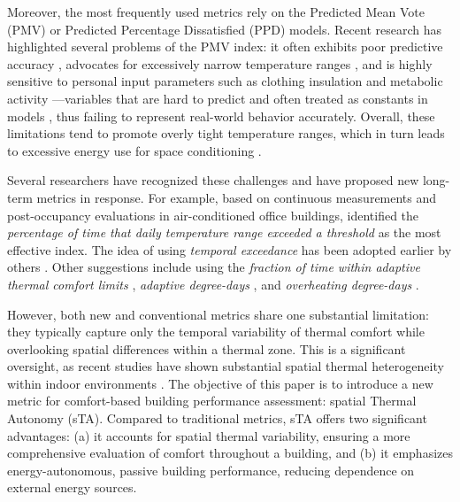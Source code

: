 Moreover, the most frequently used metrics rely on the Predicted Mean Vote (PMV) or Predicted Percentage Dissatisfied (PPD) models. Recent research has highlighted several problems of the PMV index: it often exhibits poor predictive accuracy \citep{cheung_analysis_2019}, advocates for excessively narrow temperature ranges \citep{arens_are_2010}, and is highly sensitive to personal input parameters such as clothing insulation and metabolic activity \citep{gauthier_role_2013}—variables that are hard to predict and often treated as constants in models \citep{carlucci_review_2012}, thus failing to represent real-world behavior accurately. Overall, these limitations tend to promote overly tight temperature ranges, which in turn leads to excessive energy use for space conditioning \citep{albatayneh_impact_2018, fukawa_field_2021, sekhar_thermal_2016}.

Several researchers have recognized these challenges and have proposed new long-term metrics in response. For example, based on continuous measurements and post-occupancy evaluations in air-conditioned office buildings, \citet{li_improved_2020} identified the \textit{percentage of time that daily temperature range exceeded a threshold} as the most effective index. The idea of using \textit{temporal exceedance} has been adopted earlier by others \citep{borgeson_comfort_2011, nicol_suggestion_2009}. Other suggestions include using the \textit{fraction of time within adaptive thermal comfort limits} \citep{albatayneh_development_2019}, \textit{adaptive degree-days} \citep{mcgilligan_adaptive_2011}, and \textit{overheating degree-days} \citep{estrella_guillen_comparing_2019}.

However, both new and conventional metrics share one substantial limitation: they typically capture only the temporal variability of thermal comfort while overlooking spatial differences within a thermal zone. This is a significant oversight, as recent studies have shown substantial spatial thermal heterogeneity within indoor environments \citep{mishra_thermal_2016, kramer_personal_2023}.
The objective of this paper is to introduce a new metric for comfort-based building performance assessment: spatial Thermal Autonomy (sTA). Compared to traditional metrics, sTA offers two significant advantages: (a) it accounts for spatial thermal variability, ensuring a more comprehensive evaluation of comfort throughout a building, and (b) it emphasizes energy-autonomous, passive building performance, reducing dependence on external energy sources.




